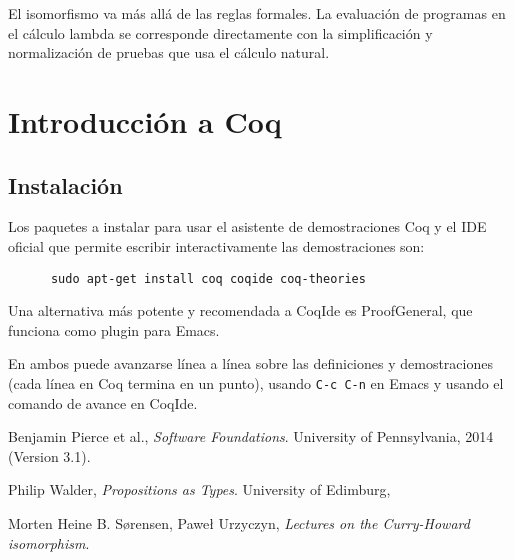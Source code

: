 \documentclass[paper=a4, fontsize=11pt, spanish]{scrartcl} %
\numberwithin{equation}{section} %
\numberwithin{figure}{section} %
\numberwithin{table}{section} %
\begin{document}
      El isomorfismo va más allá de las reglas formales. La evaluación de
      programas en el cálculo lambda se corresponde directamente con la simplificación
      y normalización de pruebas que usa el cálculo natural.
  
  \section{Introducción a Coq}
    \subsection{Instalación}
      Los paquetes a instalar para usar el asistente de demostraciones Coq y
      el IDE oficial que permite escribir interactivamente las demostraciones son:
      \begin{lstlisting}
      sudo apt-get install coq coqide coq-theories
      \end{lstlisting}
      Una alternativa más potente y recomendada a CoqIde es ProofGeneral, que funciona 
      como plugin para Emacs.
      
      En ambos puede avanzarse línea a línea sobre las definiciones y demostraciones
      (cada línea en Coq termina en un punto), usando \texttt{C-c C-n} en Emacs y usando
      el comando de avance en CoqIde.
      
%       
      
  
  
  \vfill
  \begin{thebibliography}{9}

    Benjamin Pierce et al.,
    \emph{Software Foundations}.
    University of Pennsylvania,
    2014 (Version 3.1).

    Philip Walder,
    \emph{Propositions as Types}.
    University of Edimburg,
    
    
    Morten Heine B. Sørensen, Paweł Urzyczyn,
    \emph{Lectures on the Curry-Howard isomorphism}.
    
    
  \end{thebibliography}
\end{document}
